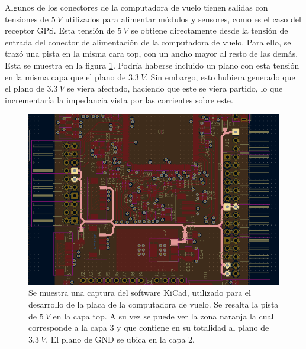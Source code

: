 
Algunos de los conectores de la computadora de vuelo tienen salidas con tensiones de $5 \ V$ utilizados para alimentar módulos y sensores, como es el caso del receptor GPS. Esta tensión de $5 \ V$ se obtiene directamente desde la tensión de entrada del conector de alimentación de la computadora de vuelo. Para ello, se trazó una pista en la misma cara top, con un ancho mayor al resto de las demás. Esta se muestra en la figura \ref{fig:pista_5V}. Podría haberse incluido un plano con esta tensión en la misma capa que el plano de $3.3 \ V$. Sin embargo, esto hubiera generado que el plano de $3.3 \ V$ se viera afectado, haciendo que este se viera partido, lo que incrementaría la impedancia vista por las corrientes sobre este.

\begin{figure}[htb]
    \centering
    \includegraphics[width=\textwidth]{img/pista_5V.png}
    \caption{Se muestra una captura del software KiCad, utilizado para el desarrollo de la placa de la computadora de vuelo. Se resalta la pista de $5 \ V$ en la capa top. A su vez se puede ver la zona naranja la cual corresponde a la capa 3 y que contiene en su totalidad al plano de $3.3 \ V$. El plano de GND se ubica en la capa 2.}
    \label{fig:pista_5V}
\end{figure}





